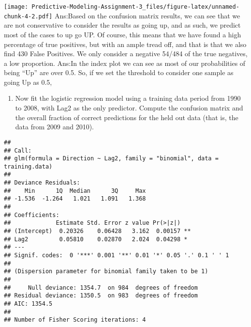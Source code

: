 \documentclass[
]{article}
\newenvironment{Shaded}{\begin{snugshade}}{\end{snugshade}}
\newcommand{\AttributeTok}[1]{\textcolor[rgb]{0.77,0.63,0.00}{#1}}
\newcommand{\DecValTok}[1]{\textcolor[rgb]{0.00,0.00,0.81}{#1}}
\newcommand{\FunctionTok}[1]{\textcolor[rgb]{0.00,0.00,0.00}{#1}}
\newcommand{\NormalTok}[1]{#1}
\newcommand{\OtherTok}[1]{\textcolor[rgb]{0.56,0.35,0.01}{#1}}
\newcommand{\SpecialCharTok}[1]{\textcolor[rgb]{0.00,0.00,0.00}{#1}}
\newcommand{\StringTok}[1]{\textcolor[rgb]{0.31,0.60,0.02}{#1}}
\providecommand{\tightlist}{%
  \setlength{\itemsep}{0pt}\setlength{\parskip}{0pt}}
\begin{document}
\texttt{[image: Predictive-Modeling-Assignment-3\_files/figure-latex/unnamed-chunk-4-2.pdf]}
Ans:Based on the confusion matrix results, we can see that we are not
conservative to consider the results as going up, and as such, we
predict most of the cases to up go UP. Of course, this means that we
have found a high percentage of true positives, but with an ample tread
off, and that is that we also find 430 False Positives. We only consider
a negative 54/484 of the true negatives, a low proportion. Ans:In the
index plot we can see as most of our probabilities of being ``Up'' are
over 0.5. So, if we set the threshold to consider one sample as going Up
as 0.5,

\begin{enumerate}
\def\labelenumi{(\alph{enumi})}
\setcounter{enumi}{3}
\tightlist
\item
  Now fit the logistic regression model using a training data period
  from 1990 to 2008, with Lag2 as the only predictor. Compute the
  confusion matrix and the overall fraction of correct predictions for
  the held out data (that is, the data from 2009 and 2010).
\end{enumerate}

\begin{Shaded}
\end{Shaded}

\begin{verbatim}
## 
## Call:
## glm(formula = Direction ~ Lag2, family = "binomial", data = training.data)
## 
## Deviance Residuals: 
##    Min      1Q  Median      3Q     Max  
## -1.536  -1.264   1.021   1.091   1.368  
## 
## Coefficients:
##             Estimate Std. Error z value Pr(>|z|)   
## (Intercept)  0.20326    0.06428   3.162  0.00157 **
## Lag2         0.05810    0.02870   2.024  0.04298 * 
## ---
## Signif. codes:  0 '***' 0.001 '**' 0.01 '*' 0.05 '.' 0.1 ' ' 1
## 
## (Dispersion parameter for binomial family taken to be 1)
## 
##     Null deviance: 1354.7  on 984  degrees of freedom
## Residual deviance: 1350.5  on 983  degrees of freedom
## AIC: 1354.5
## 
## Number of Fisher Scoring iterations: 4
\end{verbatim}
\end{document}
